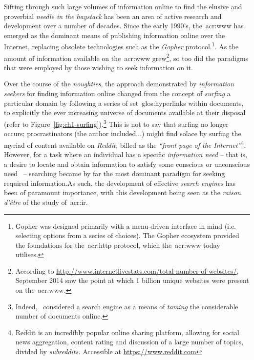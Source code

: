 Sifting through such large volumes of information online to find the elusive and proverbial \emph{needle in the haystack} has been an area of active research and development over a number of decades. Since the early 1990's, the~\gls{acr:www} has emerged as the dominant means of publishing information online over the Internet, replacing obsolete technologies such as the \emph{Gopher} protocol.\footnote{Gopher was designed primarily with a menu-driven interface in mind (i.e. selecting options from a series of choices). The Gopher ecosystem provided the foundations for the~\gls{acr:http} protocol, which the~\gls{acr:www} today utilises.}. As the amount of information available on the~\gls{acr:www} grew\footnote{According to \url{http://www.internetlivestats.com/total-number-of-websites/}, September 2014 saw the point at which 1 billion unique websites were present on the~\gls{acr:www}.}, so too did the paradigms that were employed by those wishing to seek information on it.

Over the course of the \emph{noughties}, the approach demonstrated by \emph{information seekers} for finding information online changed from the concept of \emph{surfing} a particular domain by following a series of set~\glspl{glos:hyperlink} within documents, to explicitly  the ever increasing universe of documents available at their disposal (refer to Figure~\ref{fig:ch1-surfing}).\footnote{Indeed,~\cite{mcbryan1994taming_tools} considered a search engine as a means of \emph{taming} the considerable number of documents online.} This is not to say that surfing no longer occurs; procrastinators (the author included...) might find solace by surfing the myriad of content available on \emph{Reddit,} billed as the \emph{``front page of the Internet''}\footnote{Reddit is an incredibly popular online sharing platform, allowing for social news aggregation, content rating and discussion of a large number of topics, divided by \emph{subreddits.} Accessible at \url{https://www.reddit.com}}. However, for a task where an individual has a specific \emph{information need} -- that is, a desire to locate and obtain information to satisfy some conscious or unconscious need~\citep{hjorland1997information} -- searching became by far the most dominant paradigm for seeking required information.As such, the development of effective \emph{search engines} has been of paramount importance, with this development being seen as the \emph{raison d'\^{e}tre} of the study of~\gls{acr:ir}.

